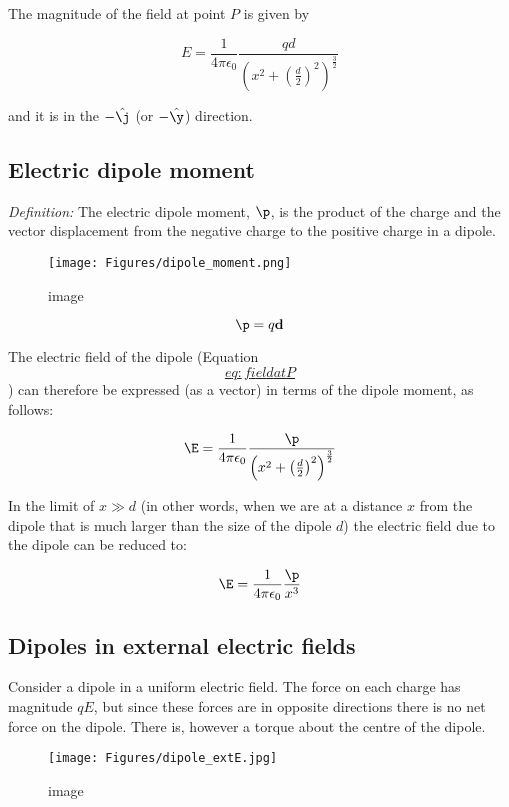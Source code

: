 \documentclass[
]{book}
\theoremstyle{definition}
\theoremstyle{definition}
\theoremstyle{definition}
\theoremstyle{definition}
\theoremstyle{remark}
\begin{document}
The magnitude of the field at point \(P\) is given by

\[\label{eq:fieldatP}
E = \frac{1}{4 \pi \epsilon_0} \frac{qd}{\left( x^2 + \left( \frac{d}{2} \right)^2 \right)^{\frac{3}{2}}}\]

and it is in the \(-\hat{\j}\) (or \(-\hat{\y}\)) direction.

\hypertarget{electric-dipole-moment}{%
\subsection{Electric dipole moment}\label{electric-dipole-moment}}

\emph{Definition:} The electric dipole moment, \(\p\), is the product of the
charge and the vector displacement from the negative charge to the
positive charge in a dipole.

\begin{figure}
\centering
\texttt{[image: Figures/dipole\_moment.png]}
\caption{image}
\end{figure}

\[\p = q \mathbf{d}\]

The electric field of the dipole (Equation
\protect\hyperlink{eq:fieldatP}{\[eq:fieldatP\]}) can therefore be expressed (as a vector) in
terms of the dipole moment, as follows:

\[\label{eq:fieldatP}
\E = \frac{1}{4 \pi \epsilon_0} \frac{\p}{\left( x^2 + \left( \frac{d}{2} \right)^2 \right)^{\frac{3}{2}}}\]

In the limit of \(x \gg d\) (in other words, when we are at a distance \(x\)
from the dipole that is much larger than the size of the dipole \(d\)) the
electric field due to the dipole can be reduced to:

\[\E = \frac{1}{4\pi \epsilon_0} \frac{\p}{x^3}\]

\hypertarget{dipoles-in-external-electric-fields}{%
\subsection{Dipoles in external electric fields}\label{dipoles-in-external-electric-fields}}

Consider a dipole in a uniform electric field. The force on each charge
has magnitude \(qE\), but since these forces are in opposite directions
there is no net force on the dipole. There is, however a torque about
the centre of the dipole.

\begin{figure}
\centering
\texttt{[image: Figures/dipole\_extE.jpg]}
\caption{image}
\end{figure}
\end{document}
